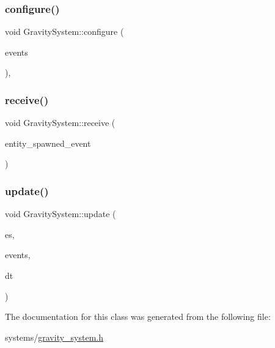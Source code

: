 \subsubsection{\texorpdfstring{configure()}{configure()}}
{\footnotesize\ttfamily void Gravity\+System\+::configure (\begin{DoxyParamCaption}\item[{ex\+::\+Event\+Manager \&}]{events }\end{DoxyParamCaption})\hspace{0.3cm}{\ttfamily [inline]}, {\ttfamily [override]}}

\mbox{\label{classGravitySystem_a9ccb1aae9dfbcbdd6c12a286010deddd}} 
\subsubsection{\texorpdfstring{receive()}{receive()}}
{\footnotesize\ttfamily void Gravity\+System\+::receive (\begin{DoxyParamCaption}\item[{const \hyperlink{classEntitySpawnedEvent}{Entity\+Spawned\+Event} \&}]{entity\+\_\+spawned\+\_\+event }\end{DoxyParamCaption})\hspace{0.3cm}{\ttfamily [inline]}}

\mbox{\label{classGravitySystem_a96d2addda17d0405ec82a1c6beb57b7a}} 
\subsubsection{\texorpdfstring{update()}{update()}}
{\footnotesize\ttfamily void Gravity\+System\+::update (\begin{DoxyParamCaption}\item[{ex\+::\+Entity\+Manager \&}]{es,  }\item[{ex\+::\+Event\+Manager \&}]{events,  }\item[{ex\+::\+Time\+Delta}]{dt }\end{DoxyParamCaption})\hspace{0.3cm}{\ttfamily [inline]}}



The documentation for this class was generated from the following file\+:\begin{DoxyCompactItemize}
\item 
systems/\hyperlink{gravity__system_8h}{gravity\+\_\+system.\+h}\end{DoxyCompactItemize}
